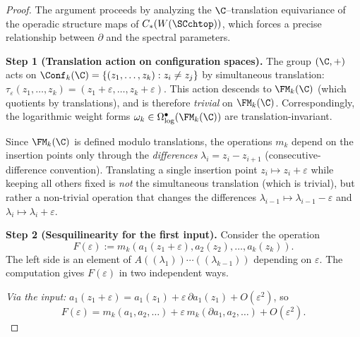 \begin{proof}
The argument proceeds by analyzing the $\C$--translation
equivariance of the operadic structure maps of
$C_\ast(W(\SCchtop))$, which forces a precise relationship
between $\partial$ and the spectral parameters.

\medskip\noindent
\textbf{Step 1 (Translation action on configuration spaces).}
The group $(\C,+)$ acts on $\Conf_k(\C) = \{(z_1,\ldots,z_k) : z_i \neq z_j\}$ by
simultaneous translation: $\tau_\varepsilon(z_1,\ldots,z_k)
= (z_1+\varepsilon,\ldots,z_k+\varepsilon)$. This action
descends to $\FM_k(\C)$ (which quotients by translations),
and is therefore \emph{trivial} on $\FM_k(\C)$. Correspondingly,
the logarithmic weight forms $\omega_k \in
\Omega^\bullet_{\log}(\FM_k(\C))$ are translation-invariant.

Since $\FM_k(\C)$ is defined modulo translations, the operations
$m_k$ depend on the insertion points only through the
\emph{differences} $\lambda_i = z_i - z_{i+1}$ (consecutive-difference
convention). Translating a single insertion
point $z_i \mapsto z_i + \varepsilon$ while keeping all others fixed is
\emph{not} the simultaneous translation (which is trivial), but
rather a non-trivial operation that changes the differences
$\lambda_{i-1} \mapsto \lambda_{i-1} - \varepsilon$ and
$\lambda_i \mapsto \lambda_i + \varepsilon$.

\medskip\noindent
\textbf{Step 2 (Sesquilinearity for the first input).}
Consider the operation
\[
 F(\varepsilon) := m_k(a_1(z_1 + \varepsilon), a_2(z_2),
 \ldots, a_k(z_k)).
\]
The left side is an element of $A((\lambda_1))\cdots((\lambda_{k-1}))$
depending on $\varepsilon$. The computation gives $F(\varepsilon)$ in two
independent ways.

\emph{Via the input:}
$a_1(z_1+\varepsilon) = a_1(z_1) + \varepsilon\,\partial a_1(z_1)
+ O(\varepsilon^2)$, so
\begin{equation}\label{eq:sesqui-F-input}
 F(\varepsilon)
 = m_k(a_1,a_2,\ldots) + \varepsilon\, m_k(\partial a_1, a_2, \ldots)
 + O(\varepsilon^2).
\end{equation}


\end{proof}
